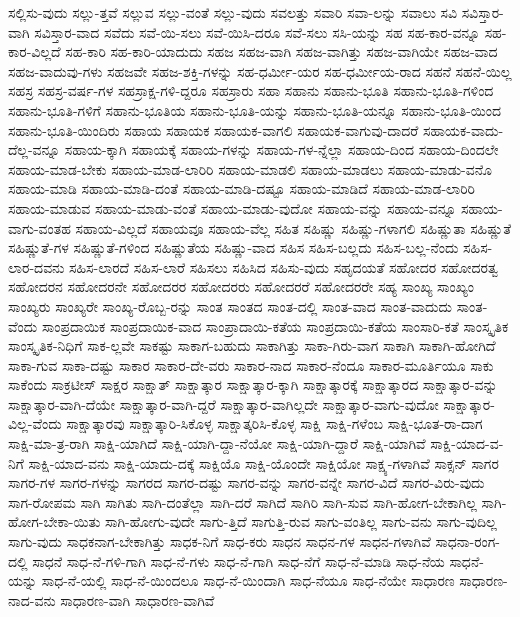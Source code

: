 {ಸಲ್ಲಿಸು-ವುದು
ಸಲ್ಲು-ತ್ತವೆ
ಸಲ್ಲುವ
ಸಲ್ಲು-ವಂತೆ
ಸಲ್ಲು-ವುದು
ಸವಲತ್ತು
ಸವಾರಿ
ಸವಾ-ಲನ್ನು
ಸವಾಲು
ಸವಿ
ಸವಿಸ್ತಾರ-ವಾಗಿ
ಸವಿಸ್ತಾರ-ವಾದ
ಸವೆದು
ಸವೆ-ಯಿ-ಸಲು
ಸವೆ-ಯಿಸಿ-ದರೂ
ಸವೆ-ಸಲು
ಸಸಿ-ಯನ್ನು
ಸಹ
ಸಹ-ಕಾರ-ವನ್ನೂ
ಸಹ-ಕಾರ-ವಿಲ್ಲದೆ
ಸಹ-ಕಾರಿ
ಸಹ-ಕಾರಿ-ಯಾದುದು
ಸಹಜ
ಸಹಜ-ವಾಗಿ
ಸಹಜ-ವಾಗಿತ್ತು
ಸಹಜ-ವಾಗಿಯೇ
ಸಹಜ-ವಾದ
ಸಹಜ-ವಾದುವು-ಗಳು
ಸಹಜವೇ
ಸಹಜ-ಶಕ್ತಿ-ಗಳನ್ನು
ಸಹ-ಧರ್ಮೀ-ಯರ
ಸಹ-ಧರ್ಮೀಯ-ರಾದ
ಸಹನೆ
ಸಹನೆ-ಯಿಲ್ಲ
ಸಹಸ್ರ
ಸಹಸ್ರ-ವರ್ಷ-ಗಳ
ಸಹಸ್ರಾಕ್ಷ-ಗಳಿ-ದ್ದರೂ
ಸಹಸ್ರಾರು
ಸಹಾ
ಸಹಾನು
ಸಹಾನು-ಭೂತಿ
ಸಹಾನು-ಭೂತಿ-ಗಳಿಂದ
ಸಹಾನು-ಭೂತಿ-ಗಳಿಗೆ
ಸಹಾನು-ಭೂತಿಯ
ಸಹಾನು-ಭೂತಿ-ಯನ್ನು
ಸಹಾನು-ಭೂತಿ-ಯನ್ನೂ
ಸಹಾನು-ಭೂತಿ-ಯಿಂದ
ಸಹಾನು-ಭೂತಿ-ಯಿಂದಿರು
ಸಹಾಯ
ಸಹಾಯಕ
ಸಹಾಯಕ-ವಾಗಲಿ
ಸಹಾಯಕ-ವಾಗುವು-ದಾದರೆ
ಸಹಾಯಕ-ವಾದು-ದೆಲ್ಲ-ವನ್ನೂ
ಸಹಾಯ-ಕ್ಕಾಗಿ
ಸಹಾಯಕ್ಕೆ
ಸಹಾಯ-ಗಳನ್ನು
ಸಹಾಯ-ಗಳ-ನ್ನೆಲ್ಲಾ
ಸಹಾಯ-ದಿಂದ
ಸಹಾಯ-ದಿಂದಲೇ
ಸಹಾಯ-ಮಾಡ-ಬೇಕು
ಸಹಾಯ-ಮಾಡ-ಲಾರಿರಿ
ಸಹಾಯ-ಮಾಡಲಿ
ಸಹಾಯ-ಮಾಡಲು
ಸಹಾಯ-ಮಾಡು-ವನೊ
ಸಹಾಯ-ಮಾಡಿ
ಸಹಾಯ-ಮಾಡಿ-ದಂತೆ
ಸಹಾಯ-ಮಾಡಿ-ದಷ್ಟೂ
ಸಹಾಯ-ಮಾಡಿದೆ
ಸಹಾಯ-ಮಾಡ-ಲಾರಿರಿ
ಸಹಾಯ-ಮಾಡುವ
ಸಹಾಯ-ಮಾಡು-ವಂತೆ
ಸಹಾಯ-ಮಾಡು-ವುದೋ
ಸಹಾಯ-ವನ್ನು
ಸಹಾಯ-ವನ್ನೂ
ಸಹಾಯ-ವಾಗು-ವಂತಹ
ಸಹಾಯ-ವಿಲ್ಲದೆ
ಸಹಾಯವೂ
ಸಹಾಯ-ವೆಲ್ಲ
ಸಹಿತ
ಸಹಿಷ್ಣು
ಸಹಿಷ್ಣು-ಗಳಾಗಲಿ
ಸಹಿಷ್ಣುತಾ
ಸಹಿಷ್ಣುತೆ
ಸಹಿಷ್ಣುತೆ-ಗಳ
ಸಹಿಷ್ಣುತೆ-ಗಳಿಂದ
ಸಹಿಷ್ಣುತೆಯ
ಸಹಿಷ್ಣು-ವಾದ
ಸಹಿಸ
ಸಹಿಸ-ಬಲ್ಲದು
ಸಹಿಸ-ಬಲ್ಲ-ನೆಂದು
ಸಹಿಸ-ಲಾರ-ದವನು
ಸಹಿಸ-ಲಾರದೆ
ಸಹಿಸ-ಲಾರೆ
ಸಹಿಸಲು
ಸಹಿಸಿದ
ಸಹಿಸು-ವುದು
ಸಹೃದಯತೆ
ಸಹೋದರ
ಸಹೋದರತ್ವ
ಸಹೋದರನ
ಸಹೋದರನೇ
ಸಹೋದರರ
ಸಹೋದರರು
ಸಹೋದರರೆ
ಸಹೋದರರೇ
ಸಹ್ಯ
ಸಾಂಖ್ಯ
ಸಾಂಖ್ಯಂ
ಸಾಂಖ್ಯರು
ಸಾಂಖ್ಯರೇ
ಸಾಂಖ್ಯ-ರೊಬ್ಬ-ರನ್ನು
ಸಾಂತ
ಸಾಂತದ
ಸಾಂತ-ದಲ್ಲಿ
ಸಾಂತ-ವಾದ
ಸಾಂತ-ವಾದುದು
ಸಾಂತ-ವೆಂದು
ಸಾಂಪ್ರದಾಯಿಕ
ಸಾಂಪ್ರದಾಯಿಕ-ವಾದ
ಸಾಂಪ್ರಾದಾಯಿ-ಕತೆಯ
ಸಾಂಪ್ರದಾಯಿ-ಕತೆಯ
ಸಾಂಸಾರಿ-ಕತೆ
ಸಾಂಸ್ಕೃತಿಕ
ಸಾಂಸ್ಕೃತಿಕ-ನಿಧಿಗೆ
ಸಾಕ-ಲ್ಲವೇ
ಸಾಕಷ್ಟು
ಸಾಕಾಗ-ಬಹುದು
ಸಾಕಾಗಿತ್ತು
ಸಾಕಾ-ಗಿರು-ವಾಗ
ಸಾಕಾಗಿ
ಸಾಕಾಗಿ-ಹೋಗಿದೆ
ಸಾಕಾ-ಗುವ
ಸಾಕಾ-ದಷ್ಟು
ಸಾಕಾರ
ಸಾಕಾರ-ದೇ-ವರು
ಸಾಕಾರ-ನಾದ
ಸಾಕಾರ-ನೆಂದೂ
ಸಾಕಾರ-ಮೂರ್ತಿಯೂ
ಸಾಕು
ಸಾಕೆಂದು
ಸಾಕ್ರಟೀಸ್
ಸಾಕ್ಷರ
ಸಾಕ್ಷಾತ್
ಸಾಕ್ಷಾತ್ಕಾರ
ಸಾಕ್ಷಾತ್ಕಾರ-ಕ್ಕಾಗಿ
ಸಾಕ್ಷಾತ್ಕಾರಕ್ಕೆ
ಸಾಕ್ಷಾತ್ಕಾರದ
ಸಾಕ್ಷಾತ್ಕಾರ-ವನ್ನು
ಸಾಕ್ಷಾತ್ಕಾರ-ವಾಗಿ-ದೆಯೇ
ಸಾಕ್ಷಾತ್ಕಾರ-ವಾಗಿ-ದ್ದರೆ
ಸಾಕ್ಷಾತ್ಕಾರ-ವಾಗಿಲ್ಲದೇ
ಸಾಕ್ಷಾತ್ಕಾರ-ವಾಗು-ವುದೋ
ಸಾಕ್ಷಾತ್ಕಾರ-ವಿಲ್ಲ-ವೆಂದು
ಸಾಕ್ಷಾತ್ಕಾರವು
ಸಾಕ್ಷಾತ್ಕಾರಿ-ಸಿಕೊಳ್ಳ
ಸಾಕ್ಷಾತ್ಕರಿಸಿ-ಕೊಳ್ಳ
ಸಾಕ್ಷಿ
ಸಾಕ್ಷಿ-ಗಳೆಂಬ
ಸಾಕ್ಷಿ-ಭೂತ-ರಾ-ದಾಗ
ಸಾಕ್ಷಿ-ಮಾ-ತ್ರ-ರಾಗಿ
ಸಾಕ್ಷಿ-ಯಾಗಿದೆ
ಸಾಕ್ಷಿ-ಯಾಗಿ-ದ್ದಾ-ನೆಯೋ
ಸಾಕ್ಷಿ-ಯಾಗಿ-ದ್ದಾರೆ
ಸಾಕ್ಷಿ-ಯಾಗಿವೆ
ಸಾಕ್ಷಿ-ಯಾದ-ವ-ನಿಗೆ
ಸಾಕ್ಷಿ-ಯಾದ-ವನು
ಸಾಕ್ಷಿ-ಯಾದು-ದಕ್ಕೆ
ಸಾಕ್ಷಿಯೊ
ಸಾಕ್ಷಿ-ಯೊಂದೇ
ಸಾಕ್ಷಿಯೋ
ಸಾಕ್ಷ್ಯ-ಗಳಾಗಿವೆ
ಸಾಕ್ಸನ್
ಸಾಗರ
ಸಾಗರ-ಗಳ
ಸಾಗರ-ಗಳನ್ನು
ಸಾಗರದ
ಸಾಗರ-ದಷ್ಟು
ಸಾಗರ-ವನ್ನು
ಸಾಗರ-ವನ್ನೇ
ಸಾಗರ-ವಿದೆ
ಸಾಗರ-ವಿರು-ವುದು
ಸಾಗ-ರೋಪಮ
ಸಾಗಿ
ಸಾಗಿತು
ಸಾಗಿ-ದಂತೆಲ್ಲಾ
ಸಾಗಿ-ದರೆ
ಸಾಗಿದೆ
ಸಾಗಿರಿ
ಸಾಗಿ-ಸುವ
ಸಾಗಿ-ಹೋಗ-ಬೇಕಾಗಿಲ್ಲ
ಸಾಗಿ-ಹೋಗ-ಬೇಕಾ-ಯಿತು
ಸಾಗಿ-ಹೋಗು-ವುದೇ
ಸಾಗು-ತ್ತಿದೆ
ಸಾಗುತ್ತಿ-ರುವ
ಸಾಗು-ವಂತಿಲ್ಲ
ಸಾಗು-ವನು
ಸಾಗು-ವುದಿಲ್ಲ
ಸಾಗು-ವುದು
ಸಾಧಕನಾಗ-ಬೇಕಾಗಿತ್ತು
ಸಾಧಕ-ನಿಗೆ
ಸಾಧ-ಕರು
ಸಾಧನ
ಸಾಧನ-ಗಳ
ಸಾಧನ-ಗಳಾಗಿವೆ
ಸಾಧನಾ-ರಂಗ-ದಲ್ಲಿ
ಸಾಧನೆ
ಸಾಧ-ನೆ-ಗಳಿ-ಗಾಗಿ
ಸಾಧ-ನೆ-ಗಳು
ಸಾಧ-ನೆ-ಗಾಗಿ
ಸಾಧ-ನೆಗೆ
ಸಾಧ-ನೆ-ಮಾಡಿ
ಸಾಧ-ನೆಯ
ಸಾಧನೆ-ಯನ್ನು
ಸಾಧ-ನೆ-ಯಲ್ಲಿ
ಸಾಧ-ನೆ-ಯಿಂದಲೂ
ಸಾಧ-ನೆ-ಯಿಂದಾಗಿ
ಸಾಧ-ನೆಯೂ
ಸಾಧ-ನೆಯೇ
ಸಾಧಾರಣ
ಸಾಧಾರಣ-ನಾದ-ವನು
ಸಾಧಾರಣ-ವಾಗಿ
ಸಾಧಾರಣ-ವಾಗಿವೆ
}
